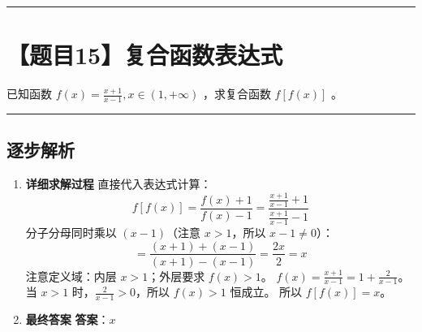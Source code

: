 \documentclass[UTF8]{ctexart}
\newenvironment{redenv}{\color{red}}{}
\newenvironment{detailedanalysis}{%
    \color{red}
    \begin{enumerate}[label=\textbf{第\arabic*步：}, leftmargin=*, align=left, itemsep=1.5ex]
}{%
    \end{enumerate}
}
\newcommand{\problemrule}{\noindent\rule{\textwidth}{1.5pt}\vspace{-0.8em}}
\newcommand{\analysisrule}{\noindent\rule{\textwidth}{0.8pt}\vspace{-0.8em}}
\begin{document}
\problemrule
\section*{【题目15】复合函数表达式}
已知函数 $ f(x)=\frac{x+1}{x-1},x\in(1,+\infty) $ ，求复合函数 $ f[f(x)] $ 。

\begin{redenv}
\analysisrule
\subsection*{逐步解析}

\begin{detailedanalysis}
\item \textbf{详细求解过程}
直接代入表达式计算：
$$ f[f(x)] = \frac{f(x)+1}{f(x)-1} = \frac{\frac{x+1}{x-1}+1}{\frac{x+1}{x-1}-1} $$
分子分母同时乘以 $(x-1)$（注意 $x>1$，所以 $x-1 \neq 0$）：
$$ = \frac{(x+1) + (x-1)}{(x+1) - (x-1)} = \frac{2x}{2} = x $$
注意定义域：内层 $x>1$；外层要求 $f(x)>1$。
$f(x) = \frac{x+1}{x-1} = 1 + \frac{2}{x-1}$。当 $x>1$ 时，$\frac{2}{x-1}>0$，所以 $f(x)>1$ 恒成立。
所以 $f[f(x)] = x$。

\item \textbf{最终答案}
\textbf{答案}：$ x $
\end{detailedanalysis}
\end{redenv}
\end{document}
